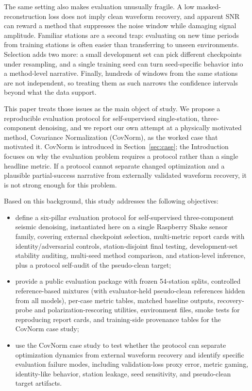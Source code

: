 \documentclass[review,12pt,authoryear]{elsarticle}
\begin{document}
The same setting also makes evaluation unusually fragile. A low masked-reconstruction loss does not imply clean waveform recovery, and apparent SNR can reward a method that suppresses the noise window while damaging signal amplitude. Familiar stations are a second trap: evaluating on new time periods from training stations is often easier than transferring to unseen environments. Selection adds two more: a small development set can pick different checkpoints under resampling, and a single training seed can turn seed-specific behavior into a method-level narrative. Finally, hundreds of windows from the same stations are not independent, so treating them as such narrows the confidence intervals beyond what the data support.

This paper treats those issues as the main object of study. We propose a reproducible evaluation protocol for self-supervised single-station, three-component denoising, and we report our own attempt at a physically motivated method, Covariance Normalization (CovNorm), as the worked case that motivated it. CovNorm is introduced in Section~\ref{sec:case}; the Introduction focuses on why the evaluation problem requires a protocol rather than a single headline metric. If a protocol cannot separate changed optimization and a plausible partial-success narrative from externally validated waveform recovery, it is not strong enough for this problem.

Based on this background, this study addresses the following objectives:
\begin{itemize}
    \item define a six-pillar evaluation protocol for self-supervised three-component seismic denoising, instantiated here on a single Raspberry Shake sensor family, covering external checkpoint selection, multi-metric report cards with identity/adversarial controls, station-disjoint final testing, development-set stability auditing, multi-seed method comparison, and station-level inference, plus a protocol self-audit of the pseudo-clean target;
    \item provide a public evaluation package with frozen 54-station splits, controlled reference-based mixtures (with evaluator-held pseudo-clean references hidden from all models), per-case metric tables, matched baseline outputs, recovery-probe and polarization-rescoring utilities, environment files, smoke tests for reproducing report cards, and training-side provenance tables for the CovNorm case study;
    \item use the CovNorm case study to test whether the protocol can separate optimization dynamics from external waveform recovery and identify specific evaluation failure modes, including validation-loss proxy error, metric gaming, identity-like behavior, station leakage, seed sensitivity, and pseudo-clean target artifacts.
\end{itemize}
\end{document}
